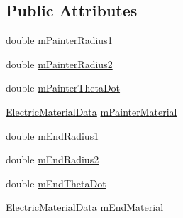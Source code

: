 \subsection*{Public Attributes}
\begin{DoxyCompactItemize}
\item 
double \hyperlink{class_item_render_data_ab75e41c0c3d9e0ab4a5eea05ff72be73}{m\-Painter\-Radius1}
\item 
double \hyperlink{class_item_render_data_aecdd63385a831142e8bb1e77168b4760}{m\-Painter\-Radius2}
\item 
double \hyperlink{class_item_render_data_a201e4edce1dc946735ea9b1b90f5990b}{m\-Painter\-Theta\-Dot}
\item 
\hyperlink{class_electric_material_data}{Electric\-Material\-Data} \hyperlink{class_item_render_data_ab57bb1aa34ce4b24269bada5366444fd}{m\-Painter\-Material}
\item 
double \hyperlink{class_item_render_data_ae553cbe13ede2dee4a95a15fb8c37725}{m\-End\-Radius1}
\item 
double \hyperlink{class_item_render_data_a879d26693545905b5f6289702b73b5e4}{m\-End\-Radius2}
\item 
double \hyperlink{class_item_render_data_add72dc0e3376793b72dae1b1fe36e965}{m\-End\-Theta\-Dot}
\item 
\hyperlink{class_electric_material_data}{Electric\-Material\-Data} \hyperlink{class_item_render_data_a95ad5539006fc0dacd26c02ab7209f57}{m\-End\-Material}
\end{DoxyCompactItemize}



